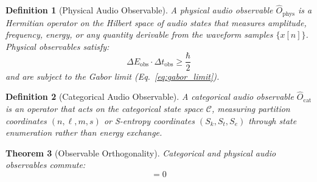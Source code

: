 \documentclass[twocolumn,10pt]{article}
\newtheorem{theorem}{Theorem}[section]
\newtheorem{definition}[theorem]{Definition}
\theoremstyle{remark}
\newcommand{\Sk}{S_k}
\newcommand{\St}{S_t}
\newcommand{\Se}{S_e}
\newcommand{\Ocat}{\hat{O}_{\mathrm{cat}}}
\newcommand{\Ophys}{\hat{O}_{\mathrm{phys}}}
\newcommand{\calC}{\mathcal{C}}
\begin{document}
\begin{definition}[Physical Audio Observable]
\label{def:physical_observable}
A physical audio observable $\Ophys$ is a Hermitian operator on the Hilbert space of audio states that measures amplitude, frequency, energy, or any quantity derivable from the waveform samples $\{x[n]\}$. Physical observables satisfy:
\begin{equation}
    \Delta E_{\mathrm{obs}} \cdot \Delta t_{\mathrm{obs}} \geq \frac{\hbar}{2}
    \label{eq:heisenberg_audio}
\end{equation}
and are subject to the Gabor limit (Eq.~\ref{eq:gabor_limit}).
\end{definition}

\begin{definition}[Categorical Audio Observable]
\label{def:categorical_observable}
A categorical audio observable $\Ocat$ is an operator that acts on the categorical state space $\calC$, measuring partition coordinates $(n, \ell, m, s)$ or S-entropy coordinates $(\Sk, \St, \Se)$ through state enumeration rather than energy exchange.
\end{definition}

\begin{theorem}[Observable Orthogonality]
\label{thm:orthogonality}
Categorical and physical audio observables commute:
\begin{equation}
    [\Ocat, \Ophys] = 0
    \label{eq:commutation_audio}
\end{equation}
\end{theorem}
\end{document}
